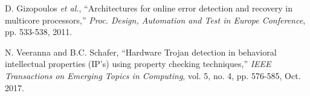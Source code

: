 \documentclass[10pt,journal, compsoc]{IEEEtran}
\begin{document}
\begin{thebibliography}{99}













D. Gizopoulos \textit{et al.}, ``Architectures for online error detection and recovery in multicore processors,'' \textit{Proc. Design, Automation and Test in Europe Conference}, pp. 533-538, 2011.

N. Veeranna and B.C. Schafer, ``Hardware Trojan detection in behavioral intellectual properties (IP's) using property checking techniques,'' \textit{IEEE Transactions on Emerging Topics in Computing}, vol. 5, no. 4, pp. 576-585, Oct. 2017.



\end{thebibliography}
\end{document}
